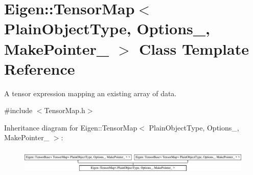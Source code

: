 \hypertarget{class_eigen_1_1_tensor_map}{}\section{Eigen\+:\+:Tensor\+Map$<$ Plain\+Object\+Type, Options\+\_\+, Make\+Pointer\+\_\+ $>$ Class Template Reference}
\label{class_eigen_1_1_tensor_map}


A tensor expression mapping an existing array of data.  




{\ttfamily \#include $<$Tensor\+Map.\+h$>$}

Inheritance diagram for Eigen\+:\+:Tensor\+Map$<$ Plain\+Object\+Type, Options\+\_\+, Make\+Pointer\+\_\+ $>$\+:\begin{figure}[H]
\begin{center}
\leavevmode
\includegraphics[height=1.176471cm]{class_eigen_1_1_tensor_map}
\end{center}
\end{figure}
